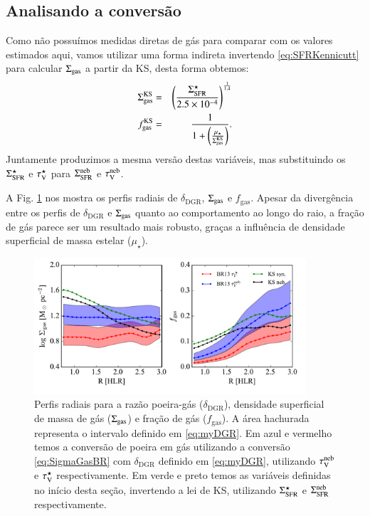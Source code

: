 \subsection{Analisando a conversão}
\label{sec:gasfrac:gas2dust:analisradperf}

Como não possuímos medidas diretas de gás para comparar com os valores estimados aqui, vamos
utilizar uma forma indireta invertendo \eqref{eq:SFRKennicutt} para calcular $\SigmaGas$ a
partir da KS, desta forma obtemos:
\begin{eqnarray}
	\Sigma_{\mathrm{gas}}^{\mathrm{KS}} &=& \left(\frac{\Sigma_{\mathrm{SFR}}^\star}{2.5 \times 10^{-4}}\right)^{\frac{1}{1.4}} \\
	\label{eq:SigmaGasKenn}
	f_{\mathrm{gas}}^{\mathrm{KS}} &=& \frac{1}{1 +
	\left(\frac{\mu_\star}{\Sigma_{\mathrm{gas}}^{\mathrm{KS}}}\right)}.
	\label{eq:fGasKenn}
\end{eqnarray}
\noindent Juntamente produzimos a mesma versão destas variáveis, mas substituindo os $\Sigma_{\mathrm{SFR}}^\star$
e $\tau_{\mathrm{V}}^\star$ para $\Sigma_{\mathrm{SFR}}^{\mathrm{neb}}$ e $\tau_{\mathrm{V}}^{\mathrm{neb}}$.

A Fig. \ref{fig:propsGasR} nos mostra os perfis radiais de $\delta_{\mathrm{DGR}}$, $\SigmaGas$ e
$f_{\mathrm{gas}}$. Apesar da divergência entre os perfis de $\delta_{\mathrm{DGR}}$ e $\SigmaGas$
quanto ao comportamento ao longo do raio, a fração de gás parece ser um resultado mais robusto,
graças a influência de densidade superficial de massa estelar ($\mu_\star$).

\begin{figure}
	\centering
	\includegraphics[width=0.9\textwidth]{figuras/gas_R.pdf}
	\caption[Perfis radiais de $\SigmaGas$ e $f_{\mathrm{gas}}$.]
	{Perfis radiais para a razão poeira-gás ($\delta_{\mathrm{DGR}}$), densidade superficial de massa
de gás ($\SigmaGas$) e fração de gás ($f_{\mathrm{gas}}$). A área hachurada representa o intervalo
definido em \eqref{eq:myDGR}. Em azul e vermelho temos a conversão de poeira em gás utilizando a
conversão \eqref{eq:SigmaGasBR} com $\delta_{\mathrm{DGR}}$ definido em \eqref{eq:myDGR},
utilizando $\tau_{\mathrm{V}}^{\mathrm{neb}}$ e $\tau_{\mathrm{V}}^\star$ respectivamente. Em verde e preto temos as variáveis definidas no
início desta seção, invertendo a lei de KS, utilizando $\Sigma_{\mathrm{SFR}}^\star$ e $\Sigma_{\mathrm{SFR}}^{\mathrm{neb}}$ respectivamente.}
	\label{fig:propsGasR}
\end{figure}

